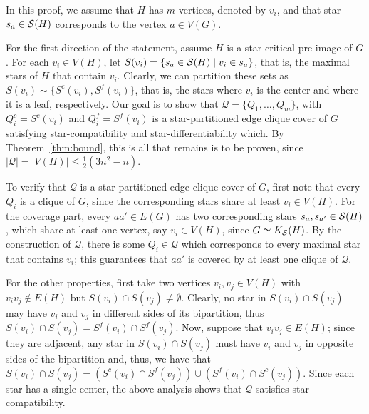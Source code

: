 \begin{tproof}
    In this proof, we assume that $H$ has $m$ vertices, denoted by $v_i$, and that star $s_a \in \mathcal{S}(H)$ corresponds to the vertex $a \in V(G)$.
    
    For the first direction of the statement, assume $H$ is a star-critical pre-image of $G$.
    For each $v_i \in V(H)$, let $S(v_i) = \{s_a \in \mathcal{S}(H) \mid v_i \in s_a\}$, that is, the maximal stars of $H$ that contain $v_i$.
    Clearly, we can partition these sets as $S(v_i) \sim \{S^c(v_i), S^f(v_i)\}$, that is, the stars where $v_i$ is the center and where it is a leaf, respectively.
    Our goal is to show that $\mathcal{Q} = \{Q_1, \dots, Q_m\}$, with $Q_i^c = S^c(v_i)$ and $Q_i^f = S^f(v_i)$ is a star-partitioned edge clique cover of $G$ satisfying star-compatibility and star-differentiability which.
    By Theorem~\ref{thm:bound}, this is all that remains is to be proven, since $|\mathcal{Q}| = |V(H)| \leq \frac{1}{2}(3n^2 - n)$.
    
    To verify that $\mathcal{Q}$ is a star-partitioned edge clique cover of $G$, first note that every $Q_i$ is a clique of $G$, since the corresponding stars share at least $v_i \in V(H)$.
    For the coverage part, every $aa' \in E(G)$ has two corresponding stars $s_a, s_{a'} \in \mathcal{S}(H)$, which share at least one vertex, say $v_i \in V(H)$, since $G \simeq K_{\mathcal{S}}(H)$.
    By the construction of $\mathcal{Q}$, there is some $Q_i \in \mathcal{Q}$ which corresponds to every maximal star that contains $v_i$; this guarantees that $aa'$ is covered by at least one clique of $\mathcal{Q}$.
    
    For the other properties, first take two vertices $v_i,v_j \in V(H)$ with $v_iv_j \notin E(H)$ but $S(v_i) \cap S(v_j) \neq \emptyset$.
    Clearly, no star in $S(v_i) \cap S(v_j)$ may have $v_i$ and $v_j$ in different sides of its bipartition, thus $S(v_i) \cap S(v_j) = S^f(v_i) \cap S^f(v_j)$.
    Now, suppose that $v_iv_j \in E(H)$; since they are adjacent, any star in $S(v_i) \cap S(v_j)$ must have $v_i$ and $v_j$ in opposite sides of the bipartition and, thus, we have that $S(v_i) \cap S(v_j) = \left(S^c(v_i) \cap S^f(v_j)\right) \cup \left(S^f(v_i) \cap S^c(v_j)\right)$.
    Since each star has a single center, the above analysis shows that $\mathcal{Q}$ satisfies star-compatibility.
    

\end{tproof}
